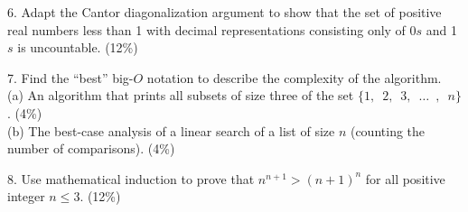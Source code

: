 \documentclass{article}
\begin{document}
6. Adapt the Cantor diagonalization argument to show that the set of positive real numbers less than 1 with decimal representations consisting only of 0$s$ 
and 1$s$ is uncountable. (12\%)

\clearpage

7. Find the ``best'' big-$\mathit{O}$ notation to describe the complexity of the algorithm.\\
(a) An algorithm that prints all subsets of size three of the set $\{1, \enspace 2, \enspace 3, \enspace \ldots \enspace , \enspace n\}$. (4\%)\\
(b) The best-case analysis of a linear search of a list of size $n$ (counting the number of comparisons). (4\%)

8. Use mathematical induction to prove that $n^{n+1}>(n + 1)^{n}$ for all positive integer $n \leq 3$. (12\%)
\end{document}
